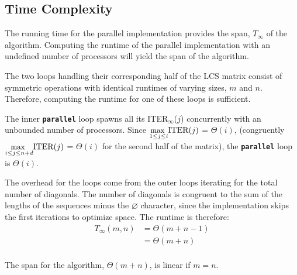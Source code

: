 \documentclass[usletter, 11pt]{extarticle}
\begin{document}
        \subsection{Time Complexity} The running time for the parallel
        implementation provides the span, $T_{\infty}$ of the algorithm.
        Computing the runtime of the parallel implementation with an undefined
        number of processors will yield the span of the algorithm.

        The two loops handling their corresponding half of the LCS matrix
        consist of symmetric operations with identical runtimes of varying
        sizes, $m$ and $n$. Therefore, computing the runtime for one of these
        loops is sufficient.

        The inner \texttt{\textbf{parallel}} loop spawns all its
        ITER$_\infty$($j$) concurrently with an unbounded number of processors.
        Since $\underset{1 \le j \le i}{\text{\small max }}\text{ITER($j$)}$ =
        $\Theta(i)$, (congruently $\underset{i \le j \le n+d}{\text{\small max
        }}\text{ITER($j$)}$ = $\Theta(i)$ for the second half of the matrix),
        the \texttt{\textbf{parallel}} loop is $\Theta(i)$.

        The overhead for the loops come from the outer loops iterating for the
        total number of diagonals. The number of diagonals is congruent to the
        sum of the lengths of the sequences minus the $\varnothing$ character,
        since the implementation skips the first iterations to optimize space.
        The runtime is therefore:
        \begin{equation*}
            \begin{split}
                T_\infty(m, n) & = \Theta(m+n-1) \\
                & = \Theta(m+n) \\
            \end{split}
        \end{equation*}

        The span for the algorithm, $\Theta(m+n)$, is linear if $m = n$.
\end{document}
